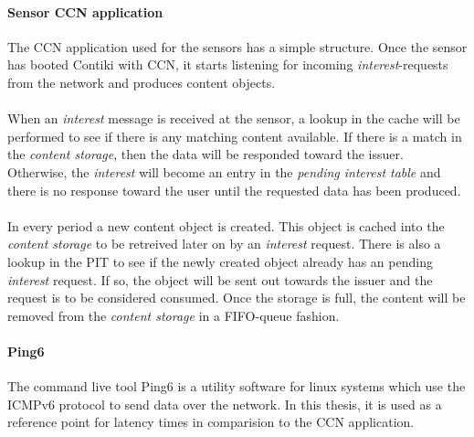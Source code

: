 \paragraph{Sensor CCN application}
The CCN application used for the sensors has a simple structure. Once the sensor has booted Contiki with CCN, it starts listening for incoming \textit{interest}-requests from the network and produces content objects.\\\\
When an \textit{interest} message is received at the sensor, a lookup in the cache will be performed to see if there is any matching content available. If there is a match in the \textit{content storage}, then the data will be responded toward the issuer. Otherwise, the \textit{interest} will become an entry in the \textit{pending interest table} and there is no response toward the user until the requested data has been produced.\\\\
In every period a new content object is created. This object is cached into the \textit{content storage} to be retreived later on by an \textit{interest} request. There is also a lookup in the PIT to see if the newly created object already has an pending \textit{interest} request. If so, the object will be sent out towards the issuer and the request is to be considered consumed. Once the storage is full, the content will be removed from the \textit{content storage} in a FIFO-queue fashion.


\paragraph{Ping6}
The command live tool Ping6 is a utility software for linux systems which use the ICMPv6 protocol to send data over the network. In this thesis, it is used as a reference point for latency times in comparision to the CCN application.



